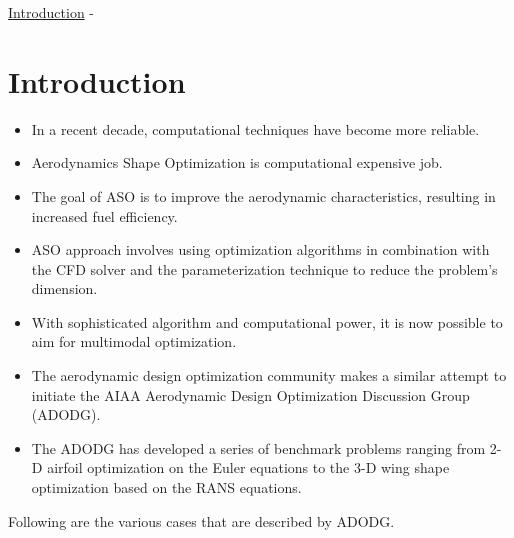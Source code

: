 \begin{frame}[allowframebreaks]{\underline{Introduction} -}
    \section{Introduction}
    
\begin{itemize}
\item In a recent decade, computational techniques have become more reliable.
\item Aerodynamics Shape Optimization is computational expensive job.
\item The goal of ASO is to improve the aerodynamic characteristics, resulting in increased fuel efficiency.
\item ASO approach involves using optimization
algorithms in combination with the CFD solver and the parameterization technique to reduce the problem’s dimension.
\item With sophisticated algorithm and computational power, it is now possible to aim for multimodal optimization. 	
\item The aerodynamic design optimization community makes a similar attempt to initiate the AIAA Aerodynamic Design Optimization Discussion Group
(ADODG).
\item The ADODG has developed a series of benchmark problems ranging from 2-D airfoil optimization on the Euler equations to the 3-D wing shape optimization based on the RANS equations.
\end{itemize}

Following are the various cases that are described by ADODG.

\end{frame}